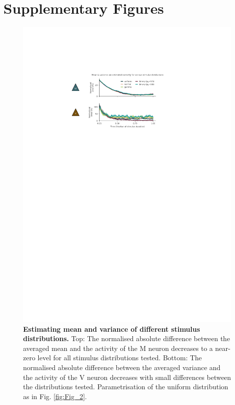 \documentclass[10pt,a4paper]{article}
\providecommand{\DIFdelbegin}{} %
\providecommand{\DIFdelend}{} %
\newcommand{\DIFscaledelfig}{0.5}
\newlength{\DIFdelgraphicswidth} %
\newlength{\DIFdelgraphicsheight} %
\newcommand{\DIFdelincludegraphics}[2][]{%
\sbox{\DIFdelgraphicsbox}{\DIFOincludegraphics[#1]{#2}}%
\settoboxwidth{\DIFdelgraphicswidth}{\DIFdelgraphicsbox} %
\settoboxtotalheight{\DIFdelgraphicsheight}{\DIFdelgraphicsbox} %
\scalebox{\DIFscaledelfig}{%
\parbox[b]{\DIFdelgraphicswidth}{\usebox{\DIFdelgraphicsbox}\\[-\baselineskip] \rule{\DIFdelgraphicswidth}{0em}}\llap{\resizebox{\DIFdelgraphicswidth}{\DIFdelgraphicsheight}{%
\setlength{\unitlength}{\DIFdelgraphicswidth}%
\begin{picture}(1,1)%
\thicklines\linethickness{2pt} %
{\color[rgb]{1,0,0}\put(0,0){\framebox(1,1){}}}%
{\color[rgb]{1,0,0}\put(0,0){\line( 1,1){1}}}%
{\color[rgb]{1,0,0}\put(0,1){\line(1,-1){1}}}%
\end{picture}%
}\hspace*{3pt}}} %
} %
\DeclareRobustCommand{\DIFdelbegin}{\DIFOdelbegin \let\includegraphics\DIFdelincludegraphics} %
\DeclareRobustCommand{\DIFdelend}{\DIFOaddend \let\includegraphics\DIFOincludegraphics} %
\begin{document}
\section{Supplementary Figures}
\DIFdelbegin %
\DIFdelend 

\begin{figure}[!h]
	\centering
    \includegraphics{../results/figures/final/Fig_2_S1.pdf}%
\caption{\footnotesize{\bf Estimating mean and variance of different stimulus distributions.\newline}  
Top: The normalised absolute difference between the averaged mean and the activity of the M neuron decreases to a near-zero level for all stimulus distributions tested. 
Bottom: The normalised absolute difference between the averaged variance and the activity of the V neuron decreases with small differences between the distributions tested. Parametrisation of the uniform distribution as in Fig. \ref{fig:Fig_2}. 
}
\label{fig:Fig_2_S1}
\end{figure}
\end{document}
